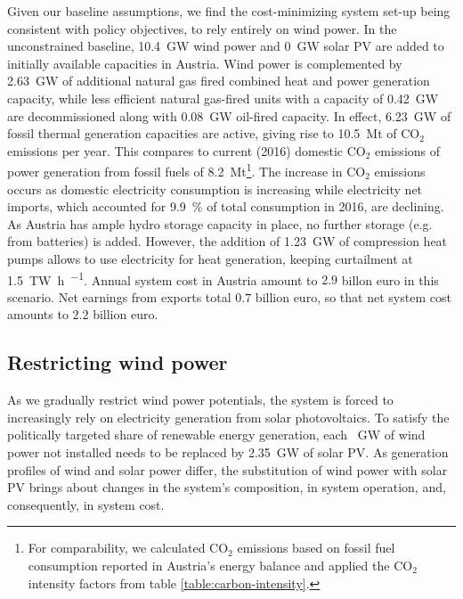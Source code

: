 \documentclass[review, 3p, times, 12pt]{elsarticle} %
\newcommand{\COO}{\ensuremath{\mathrm{CO_2}} }
\begin{document}
Given our baseline assumptions, we find the cost-minimizing system set-up being consistent with policy objectives,
to rely entirely on wind power.
In the unconstrained baseline,  \SI{10.4}{\giga\watt} wind power and \SI{0}{\giga\watt} solar PV are added to
initially available capacities in Austria.
Wind power is complemented by \SI{2.63}{\giga\watt} of additional natural gas fired combined heat and power
generation capacity, while less efficient natural gas-fired units with a capacity of \SI{0.42}{\giga\watt} are
decommissioned along with \SI{0.08}{\giga\watt} oil-fired capacity.
In effect, \SI{6.23}{\giga\watt} of fossil thermal generation capacities are active, giving rise to \SI{10.5}{\mega\tonne} of \COO emissions per year.
This compares to current (2016) domestic \COO emissions of power generation from fossil fuels of \SI{8.2}{\mega\tonne}\footnote{For comparability, we calculated \COO emissions based on fossil fuel consumption reported in Austria's energy balance \citep{StatistikAustria2020} and applied the \COO intensity factors from table \ref{table:carbon-intensity}.}. The increase in \COO emissions occurs as domestic electricity consumption is increasing while electricity net imports, which accounted for \SI{9.9}{\percent} of total consumption in 2016, are declining.
As Austria has ample hydro storage capacity in place, no further storage (e.g. from batteries) is added.
However, the addition of \SI{1.23}{\giga\watt} of compression heat pumps allows to use electricity for heat
generation, keeping curtailment at \SI{1.5}{\tera\watt\hour\per\year}.
Annual system cost in Austria amount to $2.9$ billon euro in this scenario.
Net earnings from exports total $0.7$ billion euro, so that net system cost amounts to $2.2$ billion euro.

\subsection{Restricting wind power}\label{subsec:restricting-wind}
As we gradually restrict wind power potentials, the system is forced to increasingly rely on electricity generation
from solar photovoltaics.
To satisfy the politically targeted share of renewable energy generation, each \SI{}{\giga\watt} of wind power not
installed needs to be replaced by \SI{2.35}{\giga\watt} of solar PV\@.
As generation profiles of wind and solar power differ, the substitution of wind power with solar PV brings about
changes in the system's composition, in system operation, and, consequently, in system cost.
\end{document}
